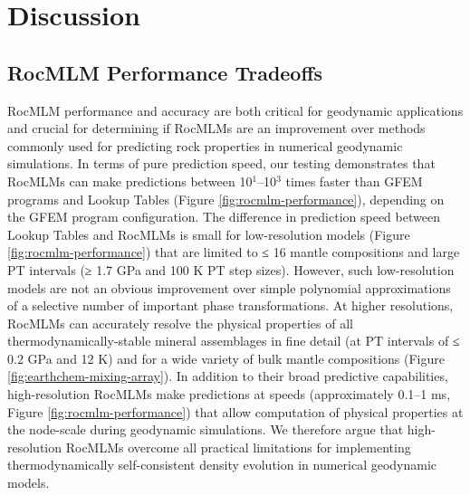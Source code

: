 \documentclass[draft,linenumbers]{agujournal2018}
\begin{document}
\section{Discussion}\label{discussion}

\subsection{RocMLM Performance Tradeoffs}\label{sec:rocmlms-tradeoffs}

RocMLM performance and accuracy are both critical for geodynamic applications and crucial for determining if RocMLMs are an improvement over methods commonly used for predicting rock properties in numerical geodynamic simulations. In terms of pure prediction speed, our testing demonstrates that RocMLMs can make predictions between 10\(^1\)--10\(^3\) times faster than GFEM programs and Lookup Tables (Figure \ref{fig:rocmlm-performance}), depending on the GFEM program configuration. The difference in prediction speed between Lookup Tables and RocMLMs is small for low-resolution models (Figure \ref{fig:rocmlm-performance}) that are limited to ≤ 16 mantle compositions and large PT intervals (≥ 1.7 GPa and 100 K PT step sizes). However, such low-resolution models are not an obvious improvement over simple polynomial approximations of a selective number of important phase transformations. At higher resolutions, RocMLMs can accurately resolve the physical properties of all thermodynamically-stable mineral assemblages in fine detail (at PT intervals of ≤ 0.2 GPa and 12 K) and for a wide variety of bulk mantle compositions (Figure \ref{fig:earthchem-mixing-array}). In addition to their broad predictive capabilities, high-resolution RocMLMs make predictions at speeds (approximately 0.1--1 ms, Figure \ref{fig:rocmlm-performance}) that allow computation of physical properties at the node-scale during geodynamic simulations. We therefore argue that high-resolution RocMLMs overcome all practical limitations for implementing thermodynamically self-consistent density evolution in numerical geodynamic models.
\end{document}
